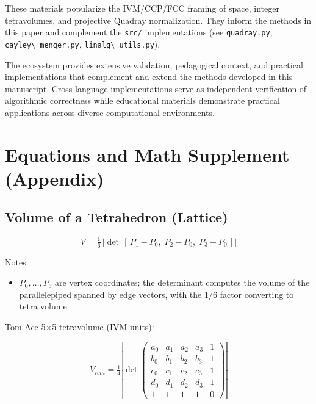 \documentclass[
  10pt,
]{article}
\newcommand{\passthrough}[1]{#1}
\providecommand{\tightlist}{%
  \setlength{\itemsep}{0pt}\setlength{\parskip}{0pt}}
\begin{document}
These materials popularize the IVM/CCP/FCC framing of space, integer
tetravolumes, and projective Quadray normalization. They inform the
methods in this paper and complement the \passthrough{\lstinline!src/!}
implementations (see \passthrough{\lstinline!quadray.py!},
\passthrough{\lstinline!cayley\_menger.py!},
\passthrough{\lstinline!linalg\_utils.py!}).

The ecosystem provides extensive validation, pedagogical context, and
practical implementations that complement and extend the methods
developed in this manuscript. Cross-language implementations serve as
independent verification of algorithmic correctness while educational
materials demonstrate practical applications across diverse
computational environments.

\newpage

\hypertarget{equations-and-math-supplement-appendix}{%
\section{Equations and Math Supplement
(Appendix)}\label{equations-and-math-supplement-appendix}}

\hypertarget{volume-of-a-tetrahedron-lattice}{%
\subsection{Volume of a Tetrahedron
(Lattice)}\label{volume-of-a-tetrahedron-lattice}}

\begin{equation}\label{eq:supp_lattice_det}
V = \tfrac{1}{6}\,\left|\det\,[\,P_1 - P_0,\; P_2 - P_0,\; P_3 - P_0\,]\right|
\end{equation}

Notes.

\begin{itemize}
\tightlist
\item
  \(P_0,\ldots,P_3\) are vertex coordinates; the determinant computes
  the volume of the parallelepiped spanned by edge vectors, with the
  \(1/6\) factor converting to tetra volume.
\end{itemize}

Tom Ace 5×5 tetravolume (IVM units):

\begin{equation}\label{eq:supp_ace5x5}
V_{ivm} = \tfrac{1}{4} \left| \det \begin{pmatrix}
 a_0 & a_1 & a_2 & a_3 & 1 \\
 b_0 & b_1 & b_2 & b_3 & 1 \\
 c_0 & c_1 & c_2 & c_3 & 1 \\
 d_0 & d_1 & d_2 & d_3 & 1 \\
  1 & 1 & 1 & 1 & 0
\end{pmatrix} \right|
\end{equation}
\end{document}
